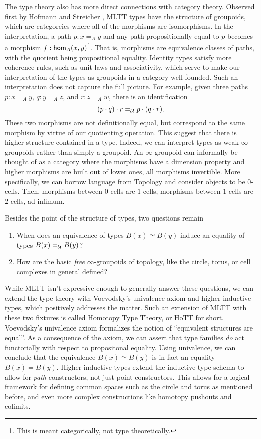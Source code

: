 \documentclass[main.tex]{subfiles}
\begin{document}
The type theory also has more direct connections with category theory. Observed first by Hofmann and Streicher \cite{hofmann1998groupoid}, MLTT types have the structure of groupoids, which are categoreies where all of the morphisms are isomorphisms. In the interpretation, a path $p : x=_A y$ and any path propositionally equal to $p$ becomes a morphism $f : \ho[A]{x}{y}$\footnote{This is meant categorically, not type theoretically.}. That is, morphisms are equivalence classes of paths, with the quotient being propositional equality. Identity types satisfy more coherence rules, such as unit laws and associativity, which serve to make our interpretation of the types as groupoids in a category well-founded. Such an interpretation does not capture the full picture. For example, given three paths $p : x =_A y$, $q : y=_A z$, and $r : z =_A w$, there is an identification
\[
(p \cdot q) \cdot r =_\U p \cdot (q \cdot r).
\]
These two morphisms are not definitionally equal, but correspond to the same morphism by virtue of our quotienting operation. This suggest that there is higher structure contained in a type. Indeed, we can interpret types as weak $\infty$-groupoids \cite{berg_garner_richard} rather than simply a groupoid. An $\infty$-groupoid can informally be thought of as a category where the morphisms have a dimension property and higher morphisms are built out of lower ones, all morphisms invertible. More specifically, we can borrow language from Topology and consider objects to be $0$-cells. Then, morphisms between $0$-cells are $1$-cells, morphisms between $1$-cells are $2$-cells, ad infimum. 

Besides the point of the structure of types, two questions remain
\begin{enumerate}
  \item When does an equivalence of types $B(x) \simeq B(y)$ induce an equality of types $B(x)=_{\U} B(y)$?
  \item How are the basic \textit{free} $\infty$-groupoids of topology, like the circle, torus, or cell complexes in general defined?
\end{enumerate}

While MLTT isn't expressive enough to generally answer these questions, we can extend the type theory with Voevodsky's univalence axiom and higher inductive types, which positively addresses the matter. Such an extension of MLTT with these two fixtures is called Homotopy Type Theory, or HoTT for short. Voevodsky's univalence axiom formalizes the notion of ``equivalent structures are equal''. As a consequence of the axiom, we can assert that type families \textit{do} act functorially with respect to propositonal equality. Using univalence, we can conclude that the equivalence $B(x) \simeq B(y)$ is in fact an equality $B(x) = B(y)$. Higher inductive types extend the inductive type schema to allow for \textit{path} constructors, not just point constructors. This allows for a logical framework for defining common spaces such as the circle and torus as mentioned before, and even more complex constructions like homotopy pushouts and colimits. 
\end{document}
